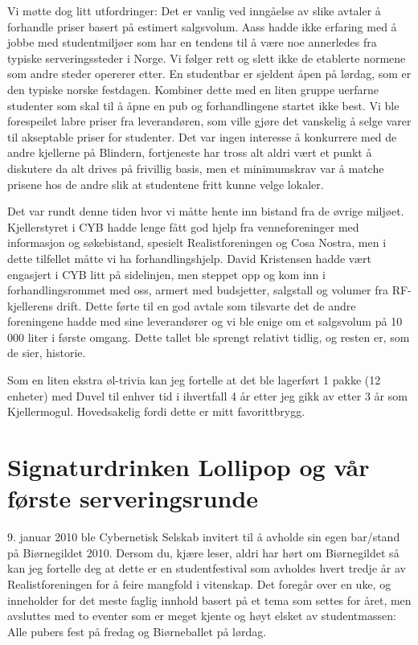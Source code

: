 Vi møtte dog litt utfordringer: Det er vanlig ved inngåelse av slike avtaler å forhandle priser basert på estimert salgsvolum. Aass hadde ikke erfaring med å jobbe med studentmiljøer som har en tendens til å være noe annerledes fra typiske serveringssteder i Norge. Vi følger rett og slett ikke de etablerte normene som andre steder opererer etter. En studentbar er sjeldent åpen på lørdag, som er den typiske norske festdagen. Kombiner dette med en liten gruppe uerfarne studenter som skal til å åpne en pub og forhandlingene startet ikke best. Vi ble forespeilet labre priser fra leverandøren, som ville gjøre det vanskelig å selge varer til akseptable priser for studenter. Det var ingen interesse å konkurrere med de andre kjellerne på Blindern, fortjeneste har tross alt aldri vært et punkt å diskutere da alt drives på frivillig basis, men et minimumskrav var å matche prisene hos de andre slik at studentene fritt kunne velge lokaler.

Det var rundt denne tiden hvor vi måtte hente inn bistand fra de øvrige miljøet. Kjellerstyret i CYB hadde lenge fått god hjelp fra venneforeninger med informasjon og søkebistand, spesielt Realistforeningen og Cosa Nostra, men i dette tilfellet måtte vi ha forhandlingshjelp. David Kristensen hadde vært engasjert i CYB litt på sidelinjen, men steppet opp og kom inn i forhandlingsrommet med oss, armert med budsjetter, salgstall og volumer fra RF-kjellerens drift. Dette førte til en god avtale som tilsvarte det de andre foreningene hadde med sine leverandører og vi ble enige om et salgsvolum på 10 000 liter i første omgang. Dette tallet ble sprengt relativt tidlig, og resten er, som de sier, historie.

Som en liten ekstra øl-trivia kan jeg fortelle at det ble lagerført 1 pakke (12 enheter) med Duvel til enhver tid i ihvertfall 4 år etter jeg gikk av etter 3 år som Kjellermogul. Hovedsakelig fordi dette er mitt favorittbrygg.

\section[Signaturdrinker]{Signaturdrinken Lollipop og vår første serveringsrunde}

9. januar 2010 ble Cybernetisk Selskab invitert til å avholde sin egen bar/stand på Biørnegildet 2010. Dersom du, kjære leser, aldri har hørt om Biørnegildet så kan jeg fortelle deg at dette er en studentfestival som avholdes hvert tredje år av Realistforeningen for å feire mangfold i vitenskap. Det foregår over en uke, og inneholder for det meste faglig innhold basert på et tema som settes for året, men avsluttes med to eventer som er meget kjente og høyt elsket av studentmassen: Alle pubers fest på fredag og Biørneballet på lørdag.

